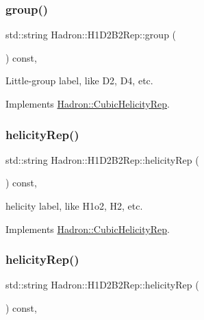 \subsubsection{\texorpdfstring{group()}{group()}\hspace{0.1cm}{\footnotesize\ttfamily [5/5]}}
{\footnotesize\ttfamily std\+::string Hadron\+::\+H1\+D2\+B2\+Rep\+::group (\begin{DoxyParamCaption}{ }\end{DoxyParamCaption}) const\hspace{0.3cm}{\ttfamily [inline]}, {\ttfamily [virtual]}}

Little-\/group label, like D2, D4, etc. 

Implements \mbox{\hyperlink{structHadron_1_1CubicHelicityRep_a101a7d76cd8ccdad0f272db44b766113}{Hadron\+::\+Cubic\+Helicity\+Rep}}.

\mbox{\label{structHadron_1_1H1D2B2Rep_a062fbbb46713530665aa762d773fa6f6}} 
\subsubsection{\texorpdfstring{helicityRep()}{helicityRep()}\hspace{0.1cm}{\footnotesize\ttfamily [1/3]}}
{\footnotesize\ttfamily std\+::string Hadron\+::\+H1\+D2\+B2\+Rep\+::helicity\+Rep (\begin{DoxyParamCaption}{ }\end{DoxyParamCaption}) const\hspace{0.3cm}{\ttfamily [inline]}, {\ttfamily [virtual]}}

helicity label, like H1o2, H2, etc. 

Implements \mbox{\hyperlink{structHadron_1_1CubicHelicityRep_af1096946b7470edf0a55451cc662f231}{Hadron\+::\+Cubic\+Helicity\+Rep}}.

\mbox{\label{structHadron_1_1H1D2B2Rep_a062fbbb46713530665aa762d773fa6f6}} 
\subsubsection{\texorpdfstring{helicityRep()}{helicityRep()}\hspace{0.1cm}{\footnotesize\ttfamily [2/3]}}
{\footnotesize\ttfamily std\+::string Hadron\+::\+H1\+D2\+B2\+Rep\+::helicity\+Rep (\begin{DoxyParamCaption}{ }\end{DoxyParamCaption}) const\hspace{0.3cm}{\ttfamily [inline]}, {\ttfamily [virtual]}}

